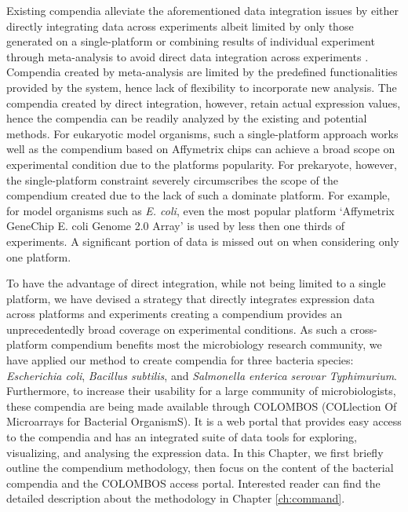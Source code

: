 Existing compendia alleviate the aforementioned data integration issues by 
either directly integrating data across experiments albeit limited by only 
those generated on a single-platform \cite{Faith2008, Hruz2008} 
or combining results of individual experiment through meta-analysis to avoid 
direct data integration across experiments 
\cite{Rhodes2007, Pan2007, Elfilali2006, Kapushesky2010}.
Compendia created by meta-analysis are limited by the predefined  
functionalities provided by the system, hence lack of flexibility to 
incorporate new analysis.
The compendia created by direct integration, however, retain actual expression 
values, hence the compendia can be readily analyzed by the existing and 
potential methods.
For eukaryotic model organisms, such a single-platform approach works well 
as the compendium based on Affymetrix chips can achieve a broad scope on 
experimental condition due to the platforms popularity.
For prekaryote, however, the single-platform constraint severely circumscribes 
the scope of the compendium created due to the lack of such a dominate platform.
For example, for model organisms such as {\it E. coli}, even the most popular 
platform `Affymetrix GeneChip E. coli Genome 2.0 Array' is used by less then 
one thirds of experiments. A significant portion of data is missed out on 
when considering only one platform.

To have the advantage of direct integration, while not being limited to a 
single platform, we have devised a strategy that directly integrates expression 
data across platforms and experiments creating a compendium provides an 
unprecedentedly broad coverage on experimental conditions.
As such a cross-platform compendium benefits most the microbiology research 
community, we have applied our method to create compendia for three 
bacteria species: \textit{Escherichia coli}, \textit{Bacillus 
subtilis}, and \textit{Salmonella enterica serovar Typhimurium}.  
Furthermore, to increase their usability for a large community of 
microbiologists, these compendia are being made available through COLOMBOS 
(COLlection Of Microarrays for Bacterial OrganismS). 
It is a web portal that provides easy access to the compendia and has an 
integrated suite of data tools for exploring, visualizing, and analysing the 
expression data.
In this Chapter, we first briefly outline the compendium methodology, then 
focus on the content of the bacterial compendia and the COLOMBOS access portal. 
Interested reader can find the detailed description about the methodology in 
Chapter \ref{ch:command}.



